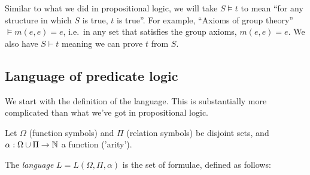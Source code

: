 \documentclass[a4paper]{article}
\begin{document}
Similar to what we did in propositional logic, we will take $S\models t$ to mean ``for any structure in which $S$ is true, $t$ is true''. For example, ``Axioms of group theory'' $\models m(e, e) = e$, i.e.\ in any set that satisfies the group axioms, $m(e, e) = e$. We also have $S\vdash t$ meaning we can prove $t$ from $S$.

\subsection{Language of predicate logic}
We start with the definition of the language. This is substantially more complicated than what we've got in propositional logic.
\begin{defi}[Language]
  Let $\Omega$ (function symbols) and $\Pi$ (relation symbols) be disjoint sets, and $\alpha : \Omega\cup\Pi \to \mathbb{N}$ a function ('arity').

  The \emph{language} $L = L(\Omega, \Pi, \alpha)$ is the set of formulae, defined as follows:


\end{defi}
\end{document}
